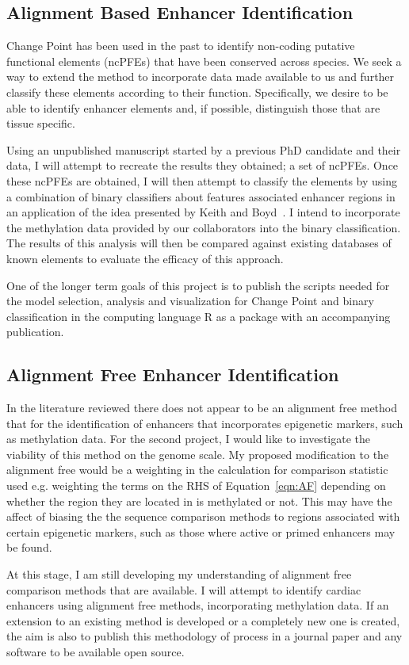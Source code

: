 \subsection{Alignment Based Enhancer Identification}

Change Point has been used in the past to identify non-coding putative functional elements (ncPFEs) that have been conserved across species. We seek a way to extend the method to incorporate data made available to us and further classify these elements according to their function. Specifically, we desire to be able to identify enhancer elements and, if possible, distinguish those that are tissue specific.

Using an unpublished manuscript started by a previous PhD candidate and their data, I will attempt to recreate the results they obtained; a set of ncPFEs. Once these ncPFEs are obtained, I will then attempt to classify the elements by using a combination of binary classifiers about features associated enhancer regions in an application of the idea presented by Keith and Boyd~\cite{keith2012bayesian}. I intend to incorporate the methylation data provided by our collaborators into the binary classification. The results of this analysis will then be compared against existing databases of known elements to evaluate the efficacy of this approach. 

One of the longer term goals of this project is to publish the scripts needed for the model selection, analysis and visualization for Change Point and binary classification in the computing language R as a package with an accompanying publication.


\subsection{Alignment Free Enhancer Identification}

In the literature reviewed there does not appear to be an alignment free method that for the identification of enhancers that incorporates epigenetic markers, such as methylation data. For the second project, I would like to investigate the viability of this method on the genome scale. My proposed modification to the alignment free would be a weighting in the calculation for comparison statistic used e.g. weighting the terms on the RHS of Equation~\ref{eqn:AF} depending on whether the region they are located in is methylated or not. This may have the affect of biasing the the sequence comparison methods to regions associated with certain epigenetic markers, such as those where active or primed enhancers may be found.

At this stage, I am still developing my understanding of alignment free comparison methods that are available. I will attempt to identify cardiac enhancers using alignment free methods, incorporating methylation data.
If an extension to an existing method is developed or a completely new one is created, the aim is also to publish this methodology of process in a journal paper and any software to be available open source.